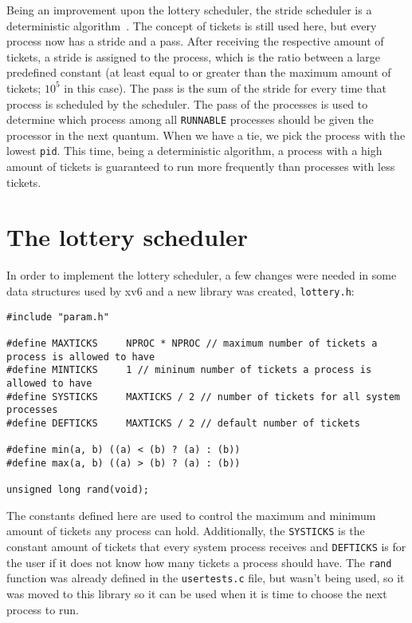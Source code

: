 \documentclass[12pt]{article}
\begin{document}
Being an improvement upon the lottery scheduler, the stride scheduler is a deterministic algorithm~\cite{waldspurger:95}. The concept of tickets is still used here, but every process now has a stride and a pass. After receiving the respective amount of tickets, a stride is assigned to the process, which is the ratio between a large predefined constant (at least equal to or greater than the maximum amount of tickets; $10^{5}$ in this case). The pass is the sum of the stride for every time that process is scheduled by the scheduler. The pass of the processes is used to determine which process among all \texttt{RUNNABLE} processes should be given the processor in the next quantum. When we have a tie, we pick the process with the lowest \texttt{pid}. This time, being a deterministic algorithm, a process with a high amount of tickets is guaranteed to run more frequently than processes with less tickets.

\section{The lottery scheduler}\label{sec:lottsched}
In order to implement the lottery scheduler, a few changes were needed in
some data structures used by xv6 and a new library was created, \texttt{lottery.h}:

\begin{scriptsize}
\begin{verbatim}
#include "param.h"

#define MAXTICKS     NPROC * NPROC // maximum number of tickets a process is allowed to have
#define MINTICKS     1 // mininum number of tickets a process is allowed to have
#define SYSTICKS     MAXTICKS / 2 // number of tickets for all system processes
#define DEFTICKS     MAXTICKS / 2 // default number of tickets

#define min(a, b) ((a) < (b) ? (a) : (b))
#define max(a, b) ((a) > (b) ? (a) : (b))

unsigned long rand(void);
\end{verbatim}
\end{scriptsize}

The constants defined here are used to control the maximum and minimum amount of tickets any process can hold. Additionally, the \texttt{SYSTICKS} is the constant amount of tickets that every system process receives and \texttt{DEFTICKS} is for the user if it does not know how many tickets a process should have. The \texttt{rand} function was already defined in the \texttt{usertests.c} file, but wasn't being used, so it was moved to this library so it can be used when it is time to choose the next process to run.
\end{document}
